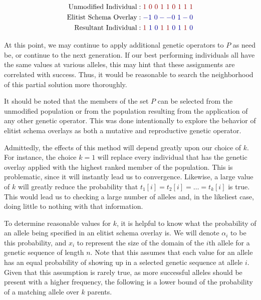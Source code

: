 \begin{displaymath}
\centering 
\begin{align*}
\text{Unmodified Individual} &: {\color{myred}1~0~0~1~1~0~1~1~1}		\\	
\text{Elitist Schema Overlay} &:   {\color{myblue}-1~0--0~1-0	}		\\  	
\text{Resultant Individual} &:  {\color{myred}1}~{\color{myblue}1~0}~ {\color{myred}1~1}~{\color{myblue}0~1}~ {\color{myred}1}~{\color{myblue}0}
\end{align*}
\end{displaymath}

At this point, we may continue to apply additional genetic operators to $P$ as need be, or continue to the next generation. If our best performing individuals all have the same values at various alleles, this may hint that these assignments are correlated with success. Thus, it would be reasonable to search the neighborhood of this partial solution more thoroughly. 

It should be noted that the members of the set $P$ can be selected from the unmodified population or from the population resulting from the application of any other genetic operator. This was done intentionally to explore the behavior of elitist schema overlays as both a mutative and reproductive genetic operator. 

Admittedly, the effects of this method will depend greatly upon our choice of $k$. For instance, the choice $k = 1$ will replace every individual that has the genetic overlay applied with the highest ranked member of the population. This is problematic, since it will instantly lead us to convergence. Likewise, a large value of $k$ will greatly reduce the probability that $t_1[i] = t_2[i] = \ldots = t_k[i]$ is true. This would lead us to checking a large number of alleles and, in the likeliest case, doing little to nothing with that information.

To determine reasonable values for $k$, it is helpful to know what the probability of an allele being specified in an elitist schema overlay is. We will denote $\alpha_i$ to be this probability, and $x_i$ to represent the size of the domain of the $i$th allele for a genetic sequence of length $n$. Note that this assumes that each value for an allele has an equal probability of showing up in a selected genetic sequence at allele $i$. Given that this assumption is rarely true, as more successful alleles should be present with a higher frequency, the following is a lower bound of the probability of a matching allele over $k$ parents.

